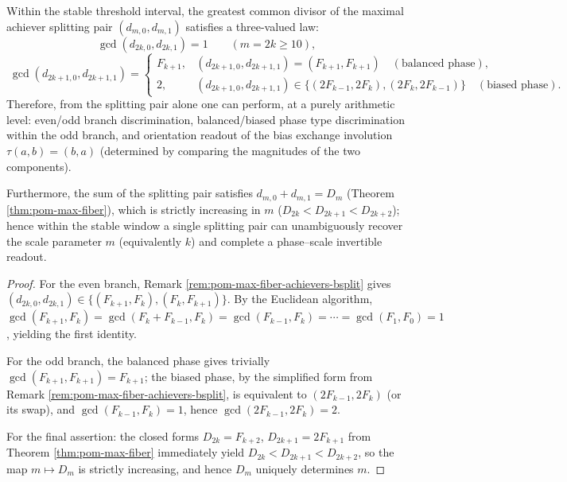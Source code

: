 \begin{corollary}\label{cor:pom-max-fiber-achievers-bsplit-gcd-trichotomy}
Within the stable threshold interval, the greatest common divisor of the maximal achiever splitting pair \((d_{m,0},d_{m,1})\) satisfies a three-valued law:
\[
\boxed{\;
\gcd(d_{2k,0},d_{2k,1})=1\qquad(m=2k\ge 10),\;}
\]
\[
\boxed{\;
\gcd(d_{2k+1,0},d_{2k+1,1})
=\begin{cases}
F_{k+1},& (d_{2k+1,0},d_{2k+1,1})=(F_{k+1},F_{k+1})\quad(\text{balanced phase}),\\
2,& (d_{2k+1,0},d_{2k+1,1})\in\{(2F_{k-1},2F_k),(2F_k,2F_{k-1})\}\quad(\text{biased phase}).
\end{cases}}
\]
Therefore, from the splitting pair alone one can perform, at a purely arithmetic level: even/odd branch discrimination, balanced/biased phase type discrimination within the odd branch, and orientation readout of the bias exchange involution \(\tau(a,b)=(b,a)\) (determined by comparing the magnitudes of the two components).
\par
Furthermore, the sum of the splitting pair satisfies \(d_{m,0}+d_{m,1}=D_m\) (Theorem \ref{thm:pom-max-fiber}), which is strictly increasing in \(m\) (\(D_{2k}<D_{2k+1}<D_{2k+2}\)); hence within the stable window a single splitting pair can unambiguously recover the scale parameter \(m\) (equivalently \(k\)) and complete a phase--scale invertible readout.
\end{corollary}
\begin{proof}
For the even branch, Remark \ref{rem:pom-max-fiber-achievers-bsplit} gives \((d_{2k,0},d_{2k,1})\in\{(F_{k+1},F_k),(F_k,F_{k+1})\}\).
By the Euclidean algorithm,
\(
\gcd(F_{k+1},F_k)=\gcd(F_k+F_{k-1},F_k)=\gcd(F_{k-1},F_k)=\cdots=\gcd(F_1,F_0)=1
\),
yielding the first identity.
\par
For the odd branch, the balanced phase gives trivially \(\gcd(F_{k+1},F_{k+1})=F_{k+1}\);
the biased phase, by the simplified form from Remark \ref{rem:pom-max-fiber-achievers-bsplit}, is equivalent to \((2F_{k-1},2F_k)\) (or its swap), and \(\gcd(F_{k-1},F_k)=1\), hence \(\gcd(2F_{k-1},2F_k)=2\).
\par
For the final assertion: the closed forms \(D_{2k}=F_{k+2}\), \(D_{2k+1}=2F_{k+1}\) from Theorem \ref{thm:pom-max-fiber} immediately yield
\(
D_{2k}<D_{2k+1}<D_{2k+2}
\),
so the map \(m\mapsto D_m\) is strictly increasing, and hence \(D_m\) uniquely determines \(m\).
\end{proof}

\endinput
